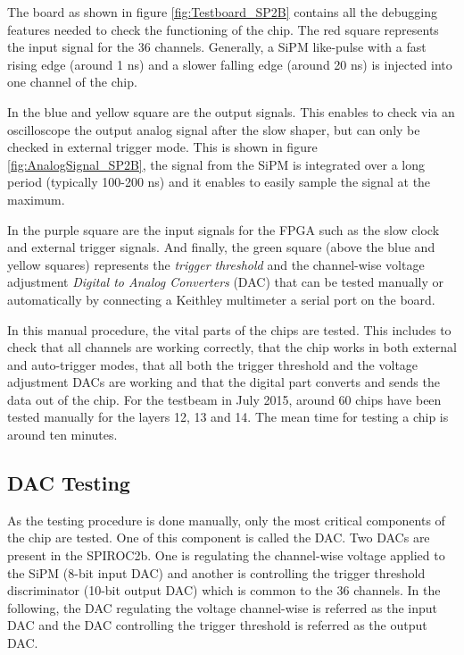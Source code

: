 The board as shown in figure \ref{fig:Testboard_SP2B} contains all the debugging features needed to check the functioning of the chip. The red square represents the input signal for the 36 channels. Generally, a SiPM like-pulse with a fast rising edge (around 1 ns) and a slower falling edge (around 20 ns) is injected into one channel of the chip.

In the blue and yellow square are the output signals. This enables to check via an oscilloscope the output analog signal after the slow shaper, but can only be checked in external trigger mode. This is shown in figure \ref{fig:AnalogSignal_SP2B}, the signal from the SiPM is integrated over a long period (typically 100-200 ns) and it enables to easily sample the signal at the maximum.

In the purple square are the input signals for the FPGA such as the slow clock and external trigger signals. And finally, the green square (above the blue and yellow squares) represents the \textit{trigger threshold} and the channel-wise voltage adjustment \textit{Digital to Analog Converters} (DAC) that can be tested manually or automatically by connecting a Keithley multimeter a serial port on the board.

In this manual procedure, the vital parts of the chips are tested. This includes to check that all channels are working correctly, that the chip works in both external and auto-trigger modes, that all both the trigger threshold and the voltage adjustment DACs are working and that the digital part converts and sends the data out of the chip. For the testbeam in July 2015, around 60 chips have been tested manually for the layers 12, 13 and 14. The mean time for testing a chip is around ten minutes.

\subsection{DAC Testing}

As the testing procedure is done manually, only the most critical components of the chip are tested. One of this component is called the DAC. Two DACs are present in the SPIROC2b. One is regulating the channel-wise voltage applied to the SiPM (8-bit input DAC) and another is controlling the trigger threshold discriminator (10-bit output DAC) which is common to the 36 channels. In the following, the DAC regulating the voltage channel-wise is referred as the input DAC and the DAC controlling the trigger threshold is referred as the output DAC.

